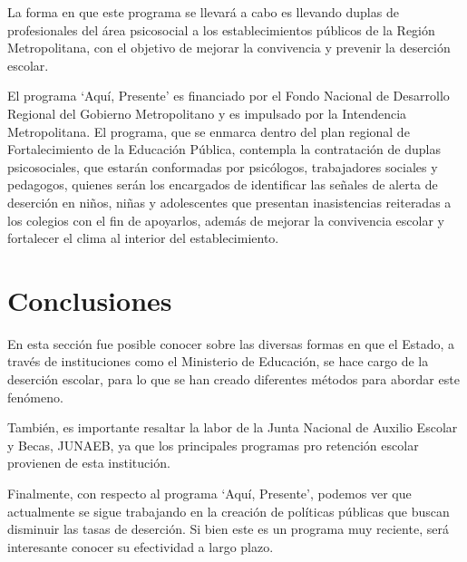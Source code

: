 La forma en que este programa se llevará a cabo es llevando duplas de profesionales del área psicosocial a los establecimientos públicos de la Región Metropolitana, con el objetivo de mejorar la convivencia y prevenir la deserción escolar. 

El programa `Aquí, Presente' es financiado por el Fondo Nacional de Desarrollo Regional del Gobierno Metropolitano y es impulsado por la Intendencia Metropolitana. El programa, que se enmarca dentro del plan regional de Fortalecimiento de la Educación Pública, contempla la contratación de duplas psicosociales, que estarán conformadas por psicólogos, trabajadores sociales y pedagogos, quienes serán los encargados de identificar las señales de alerta de deserción en niños, niñas y adolescentes que presentan inasistencias reiteradas a los colegios con el fin de apoyarlos, además de mejorar la convivencia escolar y fortalecer el clima al interior del establecimiento.

\section{Conclusiones}
En esta sección fue posible conocer sobre las diversas formas en que el Estado, a través de instituciones como el Ministerio de Educación, se hace cargo de la deserción escolar, para lo que se han creado diferentes métodos para abordar este fenómeno. 

También, es importante resaltar la labor de la Junta Nacional de Auxilio Escolar y Becas, JUNAEB, ya que los principales programas pro retención escolar provienen de esta institución. 

Finalmente, con respecto al programa `Aquí, Presente', podemos ver que actualmente se sigue trabajando en la creación de políticas públicas que buscan disminuir las tasas de deserción. Si bien este es un programa muy reciente, será interesante conocer su efectividad a largo plazo. 